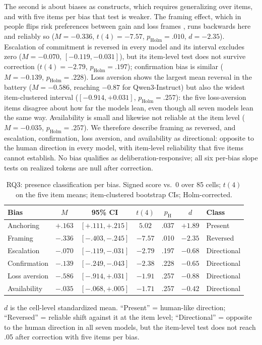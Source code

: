 \documentclass[conference]{IEEEtran}
\begin{document}
The second is about biases as constructs, which requires generalizing over items, and with five items per bias that test is weaker. The framing effect, which in people flips risk preferences between gain and loss frames \cite{tversky1981framing}, runs backwards here and reliably so ($M = -0.336$, $t(4) = -7.57$, $p_{\text{Holm}} = .010$, $d = -2.35$). Escalation of commitment is reversed in every model and its interval excludes zero ($M = -0.070$, $[-0.119, -0.031]$), but its item-level test does not survive correction ($t(4) = -2.79$, $p_{\text{Holm}} = .197$); confirmation bias is similar ($M = -0.139$, $p_{\text{Holm}} = .228$). Loss aversion shows the largest mean reversal in the battery ($M = -0.586$, reaching $-0.87$ for Qwen3-Instruct) but also the widest item-clustered interval ($[-0.914, +0.031]$, $p_{\text{Holm}} = .257$): the five loss-aversion items disagree about how far the models lean, even though all seven models lean the same way. Availability is small and likewise not reliable at the item level ($M = -0.035$, $p_{\text{Holm}} = .257$). We therefore describe framing as reversed, and escalation, confirmation, loss aversion, and availability as directional: opposite to the human direction in every model, with item-level reliability that five items cannot establish. No bias qualifies as deliberation-responsive; all six per-bias slope tests on realized tokens are null after correction.

\begin{table}[!t]
\centering
\caption{RQ3: presence classification per bias. Signed score vs.\ 0 over 85 cells; $t(4)$ on the five item means; item-clustered bootstrap CIs; Holm-corrected.}
\label{tab:rq3}
\footnotesize
\setlength{\tabcolsep}{1.9pt}
\begin{tabular}{lcccccl}
\hline
Bias & $M$ & 95\% CI & $t(4)$ & $p_{\text{H}}$ & $d$ & Class \\
\hline
Anchoring    & $+.163$ & $[+.111, +.215]$ & $5.02$  & .037 & $+1.89$ & Present \\
Framing      & $-.336$ & $[-.403, -.245]$ & $-7.57$ & .010 & $-2.35$ & Reversed \\
Escalation   & $-.070$ & $[-.119, -.031]$ & $-2.79$ & .197 & $-0.68$ & Directional \\
Confirmation & $-.139$ & $[-.249, -.043]$ & $-2.38$ & .228 & $-0.65$ & Directional \\
Loss aversion& $-.586$ & $[-.914, +.031]$ & $-1.91$ & .257 & $-0.88$ & Directional \\
Availability & $-.035$ & $[-.068, +.005]$ & $-1.71$ & .257 & $-0.42$ & Directional \\
\hline
\end{tabular}
\par\smallskip\footnotesize $d$ is the cell-level standardized mean. ``Present'' = human-like direction; ``Reversed'' = reliable shift against it at the item level; ``Directional'' = opposite to the human direction in all seven models, but the item-level test does not reach .05 after correction with five items per bias.
\end{table}
\end{document}
